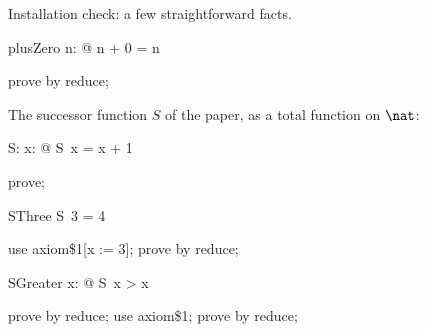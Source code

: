 \documentclass{article}
\begin{document}
Installation check: a few straightforward facts.

\begin{theorem}{plusZero}
  \forall n: \nat @ n + 0 = n
\end{theorem}

\begin{zproof}
prove by reduce;
\end{zproof}

The successor function $S$ of the paper, as a total function on $\nat$:

\begin{axdef}
  S: \nat \fun \nat
\where
  \forall x: \nat @ S~x = x + 1
\end{axdef}

\begin{zproof}[S\$domainCheck]
prove;
\end{zproof}

\begin{theorem}{SThree}
  S~3 = 4
\end{theorem}

\begin{zproof}
use axiom\$1[x := 3];
prove by reduce;
\end{zproof}

\begin{theorem}{SGreater}
  \forall x: \nat @ S~x > x
\end{theorem}

\begin{zproof}
prove by reduce;
use axiom\$1;
prove by reduce;
\end{zproof}
\end{document}
